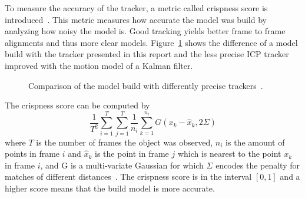 \documentclass[twoside,a4paper,article]{combine}
\begin{document}
To measure the accuracy of the tracker, a metric called crispness
score is introduced~\cite{crispness}.
This metric measures how accurate the model was build by analyzing
how noisy the model is. Good tracking yields better frame to frame
alignments and thus more clear
models. Figure~\ref{fig:good-bad-model} shows the difference of a
model build with the tracker presented in this report and the less
precise ICP tracker improved with the motion model of a Kalman filter.
\begin{figure}
  \center
  \caption{Comparison of the model build with differently precise trackers~\cite{paper}.}
  \label{fig:good-bad-model}
\end{figure}
The crispness score can be computed by
\begin{equation}
  \frac{1}{T^2}\sum_{i=1}^T\sum_{j=1}^T\frac{1}{n_i}\sum_{k=1}^{n_i}G(x_k-\hat{x}_k,2\Sigma)
\end{equation}
where $T$ is the number of frames the object was observed, $n_i$ is
the amount of points in frame $i$ and $\hat{x}_k$ is the point in
frame $j$ which is nearest to the point $x_k$ in frame $i$, and G is a
multi-variate Gaussian for which $\Sigma$ encodes the penalty for
matches of different distances~\cite{crispness,paper}. The crispness
score is in the interval $[0,1]$ and a higher score means that the
build model is more accurate.
\end{document}
